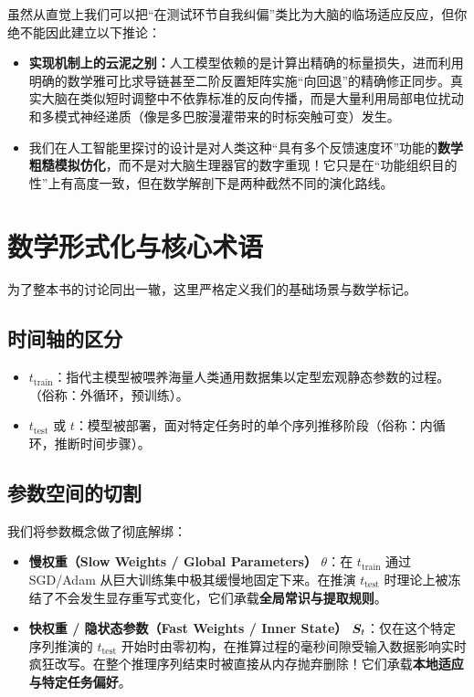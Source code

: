 \begin{analogyboundarybox}[title=这并不是说“模型就是大脑”]
虽然从直觉上我们可以把“在测试环节自我纠偏”类比为大脑的临场适应反应，但你绝不能因此建立以下推论：
\begin{itemize}
    \item \textbf{实现机制上的云泥之别：}人工模型依赖的是计算出精确的标量损失，进而利用明确的数学雅可比求导链甚至二阶反置矩阵实施“向回退”的精确修正同步。真实大脑在类似短时调整中不依靠标准的反向传播，而是大量利用局部电位扰动和多模式神经递质（像是多巴胺漫灌带来的时标突触可变）发生。
    \item 我们在人工智能里探讨的设计是对人类这种“具有多个反馈速度环”功能的\textbf{数学粗糙模拟仿化}，而不是对大脑生理器官的数字重现！它只是在“功能组织目的性”上有高度一致，但在数学解剖下是两种截然不同的演化路线。
\end{itemize}
\end{analogyboundarybox}

\section{数学形式化与核心术语}
\label{sec:intro_math}

为了整本书的讨论同出一辙，这里严格定义我们的基础场景与数学标记。

\subsection{时间轴的区分}
\begin{itemize}
    \item $t_\text{train}$：指代主模型被喂养海量人类通用数据集以定型宏观静态参数的过程。（俗称：外循环，预训练）。
    \item $t_\text{test}$ 或 $t$：模型被部署，面对特定任务时的单个序列推移阶段（俗称：内循环，推断时间步骤）。
\end{itemize}

\subsection{参数空间的切割}
我们将参数概念做了彻底解绑：
\begin{itemize}
    \item \textbf{慢权重（Slow Weights / Global Parameters）} $\theta$：在 $t_\text{train}$ 通过 SGD/Adam 从巨大训练集中极其缓慢地固定下来。在推演 $t_\text{test}$ 时理论上被冻结了不会发生显存重写式变化，它们承载\textbf{全局常识与提取规则}。
    \item \textbf{快权重 / 隐状态参数（Fast Weights / Inner State）} $\boldsymbol{S}_t$：仅在这个特定序列推演的 $t_\text{test}$ 开始时由零初构，在推算过程的毫秒间隙受输入数据影响实时疯狂改写。在整个推理序列结束时被直接从内存抛弃删除！它们承载\textbf{本地适应与特定任务偏好}。
\end{itemize}


